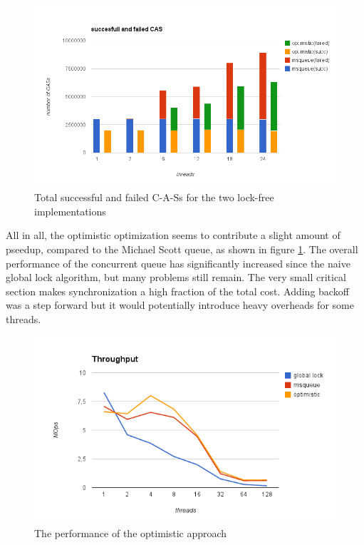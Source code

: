 \begin{figure}
 \centering
  \includegraphics[scale=0.5]{failed_cas.png}
\caption{Total successful and failed C-A-Ss for the two lock-free implementations}
\end{figure}

All in all, the optimistic optimization seems to contribute a slight amount of pseedup, compared to the Michael Scott queue, as shown in figure \ref{queue_optimistic_perf}. The overall performance of the concurrent queue has significantly increased since the naive global lock algorithm, but many problems still remain. The very small critical section makes synchronization a high fraction of the total cost. Adding backoff was a step forward but it would potentially introduce heavy overheads for some threads.


\begin{figure}
 \centering
  \includegraphics[scale=0.5]{queue_optimistic_perf.png}
\caption{The performance of the optimistic approach}
\label{queue_optimistic_perf}
\end{figure}

